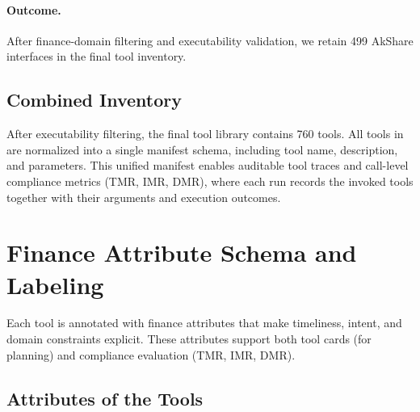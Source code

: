 \paragraph{Outcome.}
After finance-domain filtering and executability validation, we retain 499 AkShare interfaces in the final tool inventory.

\subsection{Combined Inventory}

After executability filtering, the final tool library contains 760 tools.
All tools in \bench{} are normalized into a single manifest schema, including tool name, description, and parameters.
This unified manifest enables auditable tool traces and call-level compliance metrics (TMR, IMR, DMR), where each run records the invoked tools together with their arguments and execution outcomes.


\section{Finance Attribute Schema and Labeling}
\label{sec:attributes}

Each tool is annotated with finance attributes that make timeliness, intent, and domain constraints explicit.
These attributes support both tool cards (for planning) and compliance evaluation (TMR, IMR, DMR).

\subsection{Attributes of the Tools}

